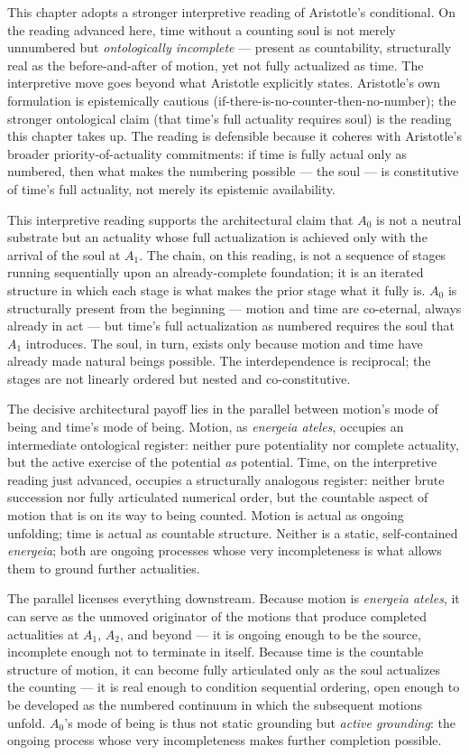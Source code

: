 \documentclass[12pt]{article}
\begin{document}
This chapter adopts a stronger interpretive reading of Aristotle's conditional. On the reading advanced here, time without a counting soul is not merely unnumbered but \textit{ontologically incomplete} --- present as countability, structurally real as the before-and-after of motion, yet not fully actualized as time. The interpretive move goes beyond what Aristotle explicitly states. Aristotle's own formulation is epistemically cautious (if-there-is-no-counter-then-no-number); the stronger ontological claim (that time's full actuality requires soul) is the reading this chapter takes up. The reading is defensible because it coheres with Aristotle's broader priority-of-actuality commitments: if time is fully actual only as numbered, then what makes the numbering possible --- the soul --- is constitutive of time's full actuality, not merely its epistemic availability.

This interpretive reading supports the architectural claim that $A_0$ is not a neutral substrate but an actuality whose full actualization is achieved only with the arrival of the soul at $A_1$. The chain, on this reading, is not a sequence of stages running sequentially upon an already-complete foundation; it is an iterated structure in which each stage is what makes the prior stage what it fully is. $A_0$ is structurally present from the beginning --- motion and time are co-eternal, always already in act --- but time's full actualization as numbered requires the soul that $A_1$ introduces. The soul, in turn, exists only because motion and time have already made natural beings possible. The interdependence is reciprocal; the stages are not linearly ordered but nested and co-constitutive.

The decisive architectural payoff lies in the parallel between motion's mode of being and time's mode of being. Motion, as \textit{energeia ateles}, occupies an intermediate ontological register: neither pure potentiality nor complete actuality, but the active exercise of the potential \textit{as} potential. Time, on the interpretive reading just advanced, occupies a structurally analogous register: neither brute succession nor fully articulated numerical order, but the countable aspect of motion that is on its way to being counted. Motion is actual as ongoing unfolding; time is actual as countable structure. Neither is a static, self-contained \textit{energeia}; both are ongoing processes whose very incompleteness is what allows them to ground further actualities.

The parallel licenses everything downstream. Because motion is \textit{energeia ateles}, it can serve as the unmoved originator of the motions that produce completed actualities at $A_1$, $A_2$, and beyond --- it is ongoing enough to be the source, incomplete enough not to terminate in itself. Because time is the countable structure of motion, it can become fully articulated only as the soul actualizes the counting --- it is real enough to condition sequential ordering, open enough to be developed as the numbered continuum in which the subsequent motions unfold. $A_0$'s mode of being is thus not static grounding but \textit{active grounding}: the ongoing process whose very incompleteness makes further completion possible.
\end{document}
